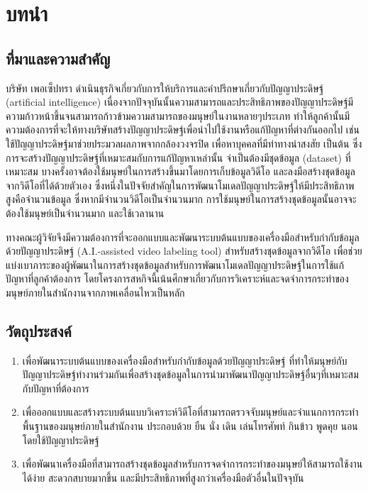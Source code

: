 \chapter{บทนำ}
\section{ที่มาและความสำคัญ}
บริษัท เพอเซ็ปทรา ดำเนินธุรกิจเกี่ยวกับการให้บริการและคำปรึกษาเกี่ยวกับปัญญาประดิษฐ์ (artificial intelligence)
เนื่องจากปัจจุบันนั้นความสามารถและประสิทธิภาพของปัญญาประดิษฐ์มีความก้าวหน้าขึ้นจนสามารถก้าวข้ามความสามารถของมนุษย์ในงานหลายๆประเภท
ทำให้ลูกค้านั้นมีความต้องการที่จะให้ทางบริษัทสร้างปัญญาประดิษฐ์เพื่อนำไปใช้งานหรือแก้ปัญหาที่ต่างกันออกไป เช่น ใช้ปัญญาประดิษฐ์มาช่วยประมวลผลภาพจากกล้องวงจรปิด เพื่อหาบุคคลที่มีท่าทางน่าสงสัย เป็นต้น
ซึ่งการจะสร้างปัญญาประดิษฐ์ที่เหมาะสมกับการแก้ปัญหาเหล่านั้น จำเป็นต้องมีชุดข้อมูล (dataset) ที่เหมาะสม บางครั้งอาจต้องใช้มนุษย์ในการสร้างขึ้นมาโดยการเก็บข้อมูลวิดีโอ 
และลงมือสร้างชุดข้อมูลจากวิดีโอที่ได้ด้วยตัวเอง ซึ่งหนึ่งในปัจจัยสำคัญในการพัฒนาโมเดลปัญญาประดิษฐ์ให้มีประสิทธิภาพสูงคือจำนวนข้อมูล
ซึ่งหากมีจำนวนวิดีโอเป็นจำนวนมาก การใช้มนุษย์ในการสร้างชุดข้อมูลนั้นอาจจะต้องใช้มนุษย์เป็นจำนวนมาก และใช้เวลานาน 

ทางคณะผู้วิจัยจึงมีความต้องการที่จะออกแบบและพัฒนาระบบต้นแบบของเครื่องมือสำหรับกำกับข้อมูลด้วยปัญญาประดิษฐ์ (A.I.-assisted video labeling tool) สำหรับสร้างชุดข้อมูลจากวิดีโอ 
เพื่อช่วยแบ่งเบาภาระของผู้พัฒนาในการสร้างชุดข้อมูลสำหรับการพัฒนาโมเดลปัญญาประดิษฐ์ในการใช้แก้ปัญหาที่ลูกค้าต้องการ 
โดยโครงการสหกิจนี้เน้นศึกษาเกี่ยวกับการวิเคราะห์และจดจำการกระทำของมนุษย์ภายในสำนักงานจากภาพเคลื่อนไหวเป็นหลัก

\section{วัตถุประสงค์}
\begin{enumerate}
	\setlength\itemsep{-0.25em}
	\item เพื่อพัฒนาระบบต้นแบบของเครื่องมือสำหรับกำกับข้อมูลด้วยปัญญาประดิษฐ์ ที่ทำให้มนุษย์กับปัญญาประดิษฐ์ทำงานร่วมกันเพื่อสร้างชุดข้อมูลในการนำมาพัฒนาปัญญาประดิษฐ์อื่นๆที่เหมาะสมกับปัญหาที่ต้องการ
	\item เพื่อออกแบบและสร้างระบบต้นแบบวิเคราะห์วิดีโอที่สามารถตรวจจับมนุษย์และจำแนกการกระทำพื้นฐานของมนุษย์ภายในสำนักงาน ประกอบด้วย ยืน นั่ง เดิน เล่นโทรศัพท์ กินข้าว พูดคุย นอน โดยใช้ปัญญาประดิษฐ์
	\item เพื่อพัฒนาเครื่องมือที่สามารถสร้างชุดข้อมูลสำหรับการจดจำการกระทำของมนุษย์ให้สามารถใช้งานได้ง่าย สะดวกสบายมากขึ้น และมีประสิทธิภาพที่สูงกว่าเครื่องมือตัวอื่นในปัจจุบัน
\end{enumerate}

